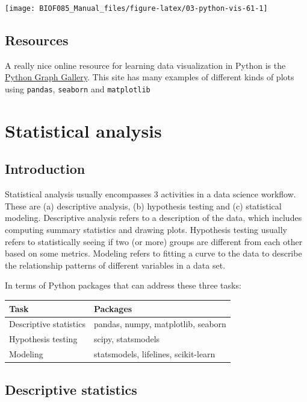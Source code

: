 \documentclass[
  letterpaper,
]{scrbook}
\begin{document}
\begin{center}\texttt{[image: BIOF085\_Manual\_files/figure-latex/03-python-vis-61-1]} \end{center}

\hypertarget{resources}{%
\section{Resources}\label{resources}}

A really nice online resource for learning data visualization in Python is the \href{https://python-graph-gallery.com/}{Python Graph Gallery}. This site has many examples of different kinds of plots using \texttt{pandas}, \texttt{seaborn} and \texttt{matplotlib}

\hypertarget{statistical-analysis}{%
\chapter{Statistical analysis}\label{statistical-analysis}}

\hypertarget{introduction-3}{%
\section{Introduction}\label{introduction-3}}

Statistical analysis usually encompasses 3 activities in a data science workflow. These are (a) descriptive analysis, (b) hypothesis testing and (c) statistical modeling. Descriptive analysis refers to a description of the data, which includes computing summary statistics and drawing plots. Hypothesis testing usually refers to statistically seeing if two (or more) groups are different from each other based on some metrics. Modeling refers to fitting a curve to the data to describe the relationship patterns of different variables in a data set.

In terms of Python packages that can address these three tasks:

\begin{longtable}[]{@{}ll@{}}
\toprule
Task & Packages\tabularnewline
\midrule
\endhead
Descriptive statistics & pandas, numpy, matplotlib, seaborn\tabularnewline
Hypothesis testing & scipy, statsmodels\tabularnewline
Modeling & statsmodels, lifelines, scikit-learn\tabularnewline
\bottomrule
\end{longtable}

\hypertarget{descriptive-statistics}{%
\section{Descriptive statistics}\label{descriptive-statistics}}
\end{document}
